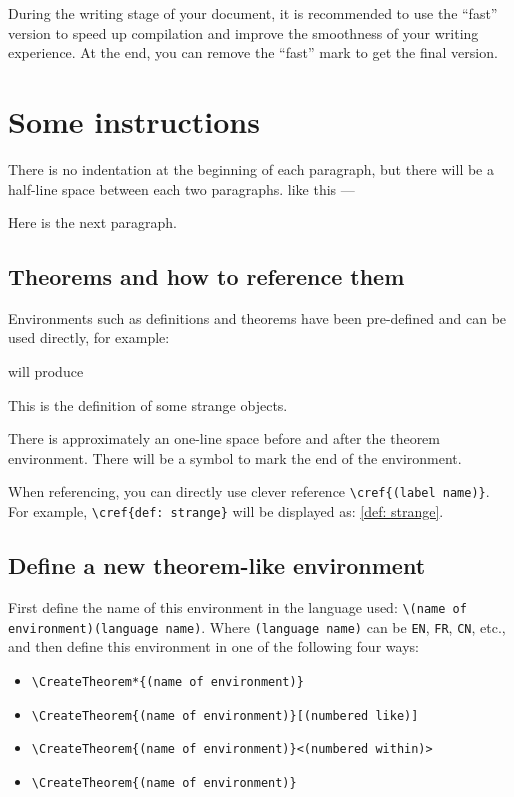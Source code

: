 \documentclass{einfart}
\begin{document}
During the writing stage of your document, it is recommended to use the ``fast'' version to speed up compilation and improve the smoothness of your writing experience. At the end, you can remove the ``fast'' mark to get the final version.

\section{Some instructions}

There is no indentation at the beginning of each paragraph, but there will be a half-line space between each two paragraphs. like this ---

Here is the next paragraph.

\subsection{Theorems and how to reference them}

Environments such as definitions and theorems have been pre-defined and can be used directly, for example:

There is approximately an one-line space before and after the theorem environment. There will be a symbol to mark the end of the environment.

When referencing, you can directly use clever reference \lstinline|\cref{(label name)}|. For example, \lstinline|\cref{def: strange}| will be displayed as: \cref{def: strange}.

\subsection{Define a new theorem-like environment}

First define the name of this environment in the language used: \lstinline|\(name of environment)(language name)|. Where \lstinline|(language name)| can be \lstinline|EN|, \lstinline|FR|, \lstinline|CN|, etc., and then define this environment in one of the following four ways:
\begin{itemize}
    \item \lstinline|\CreateTheorem*{(name of environment)}|
    \item \lstinline|\CreateTheorem{(name of environment)}[(numbered like)]|
    \item \lstinline|\CreateTheorem{(name of environment)}<(numbered within)>|
    \item \lstinline|\CreateTheorem{(name of environment)}|
\end{itemize}
\end{document}
